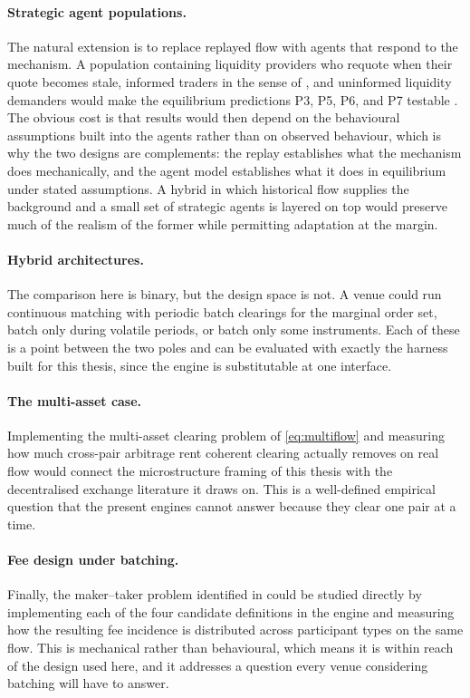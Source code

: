 \paragraph{Strategic agent populations.} The natural extension is to
replace replayed flow with agents that respond to the mechanism. A
population containing liquidity providers who requote when their quote
becomes stale, informed traders in the sense of \citet{kyle1985continuous},
and uninformed liquidity demanders would make the equilibrium
predictions P3, P5, P6, and P7 testable
\citep{lebaron2006agent}. The obvious cost is that results would then
depend on the behavioural assumptions built into the agents rather than
on observed behaviour, which is why the two designs are complements: the
replay establishes what the mechanism does mechanically, and the agent
model establishes what it does in equilibrium under stated assumptions.
A hybrid in which historical flow supplies the background and a small
set of strategic agents is layered on top would preserve much of the
realism of the former while permitting adaptation at the margin.

\paragraph{Hybrid architectures.} The comparison here is binary, but the
design space is not. A venue could run continuous matching with periodic
batch clearings for the marginal order set, batch only during volatile
periods, or batch only some instruments. Each of these is a point
between the two poles and can be evaluated with exactly the harness
built for this thesis, since the engine is substitutable at one
interface.

\paragraph{The multi-asset case.} Implementing the multi-asset clearing
problem of \eqref{eq:multiflow} and measuring how much cross-pair
arbitrage rent coherent clearing actually removes on real flow would
connect the microstructure framing of this thesis with the decentralised
exchange literature it draws on. This is a well-defined empirical
question that the present engines cannot answer because they clear one
pair at a time.

\paragraph{Fee design under batching.} Finally, the maker--taker problem
identified in  could be studied directly by
implementing each of the four candidate definitions in the engine and
measuring how the resulting fee incidence is distributed across
participant types on the same flow. This is mechanical rather than
behavioural, which means it is within reach of the design used here, and
it addresses a question every venue considering batching will have to
answer.
